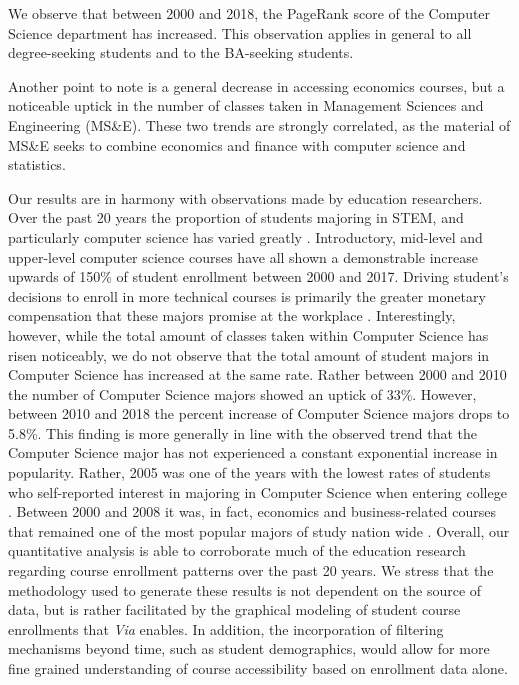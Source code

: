 We observe that between 2000 and 2018, the PageRank score of the
Computer Science department has increased. This observation applies in
general to all degree-seeking students and to the BA-seeking
students.

Another point to note is a general decrease in accessing economics
courses, but a noticeable uptick in the number of classes taken in
Management Sciences and Engineering (MS\&E). These two trends are
strongly correlated, as the material of MS\&E seeks to combine
economics and finance with computer science and statistics.




Our results are in harmony with observations made by education researchers. Over the past 20 years the proportion of students majoring in STEM, and particularly computer science has varied greatly \cite{ComputingResearchAssociation2017}. Introductory, mid-level and upper-level computer science courses have all shown a demonstrable increase upwards of 150\% of student enrollment between 2000 and 2017. Driving student's decisions to enroll in more technical courses is primarily the greater monetary compensation that these majors promise at the workplace \cite{Downey2007}. Interestingly, however, while the total amount of classes taken within Computer Science has risen noticeably, we do not observe that the total amount of student majors in Computer Science has increased at the same rate. Rather between 2000 and 2010 the number of Computer Science majors showed an uptick of 33\%. However, between 2010 and 2018 the percent increase of Computer Science majors drops to 5.8\%. This finding is more generally in line with the observed trend that the Computer Science major has not experienced a constant exponential increase in popularity. Rather, 2005 was one of the years with the lowest rates of students who self-reported interest in majoring in Computer Science when entering college \cite{Patterson2005}. Between 2000 and 2008 it was, in fact, economics and business-related courses that remained one of the most popular majors of study nation wide \cite{NationalCenterforEducation2018}. Overall, our quantitative analysis is able to corroborate much of the education research regarding course enrollment patterns over the past 20 years. We stress that the methodology used to generate these results is not dependent on the source of data, but is rather facilitated by the graphical modeling of student course enrollments that \textit{Via} enables. In addition, the incorporation of filtering mechanisms beyond time, such as student demographics, would allow for more fine grained understanding of course accessibility based on enrollment data alone.
